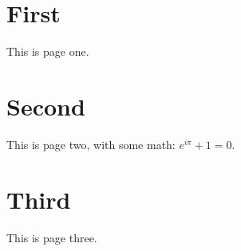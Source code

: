 \documentclass{article}
\begin{document}
\section{First}
This is page one.
\newpage
\section{Second}
This is page two, with some math: $e^{i\pi} + 1 = 0$.
\newpage
\section{Third}
This is page three.
\end{document}
